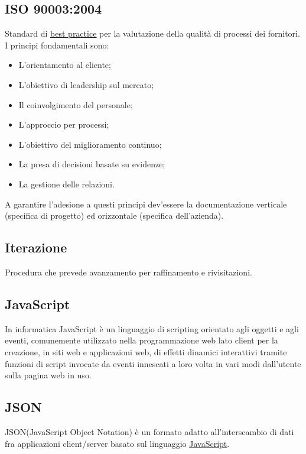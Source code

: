 	\subsection{ISO 90003:2004}
	\label{sec:iso90003}
	Standard di \underline{\hyperref[sec:bestpractice]{best practice}} per la valutazione della qualità di processi dei fornitori. I principi fondamentali sono:
	\begin{itemize}  
	\item L'orientamento al cliente;
	\item L'obiettivo di leadership sul mercato;
	\item Il coinvolgimento del personale;
	\item L'approccio per processi;
	\item L'obiettivo del miglioramento continuo;
	\item La presa di decisioni basate su evidenze;
	\item La gestione delle relazioni.
	\end{itemize}	
	A garantire l'adesione a questi principi dev'essere la documentazione verticale (specifica di progetto) ed orizzontale (specifica dell'azienda).	
	
	\subsection{Iterazione}
	\label{sec:iterazione}
	Procedura che prevede avanzamento per raffinamento e rivisitazioni.\newpage
	
	
	\subsection{JavaScript}
	\label{sec:javascript}
	In informatica JavaScript è un linguaggio di scripting orientato agli oggetti e agli eventi, comunemente utilizzato nella programmazione web lato client per la creazione, in siti web e applicazioni web, di effetti dinamici interattivi tramite funzioni di script invocate da eventi innescati a loro volta in vari modi dall'utente sulla pagina web in uso.
	
	\subsection{JSON}
	JSON(JavaScript Object Notation) è un formato adatto all'interscambio di dati fra applicazioni client/server basato sul linguaggio \underline{\hyperref[sec:javascript]{JavaScript}}.
	\newpage

